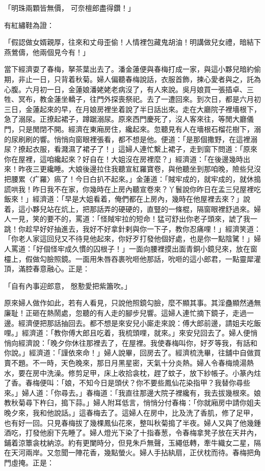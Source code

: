\begin{showcontents}{}
「明珠兩顆皆無價，  可奈檀郎盡得鑽！」

有紅繡鞋為證：

「假認做女婿親厚，往來和丈母歪偷！人情裡包藏鬼胡油！明講做兒女禮，暗結下燕鶯儔，他兩個見今有！」

當下經濟耍了春梅，拏茶葉出去了。潘金蓮便與春梅打成一家，與這小夥兒暗約偷期，非止一日，只背着秋菊。婦人偏聽春梅說話，衣服首飾，揀心愛者與之，託為心腹。六月初一日，金蓮娘潘姥姥老病沒了，有人來說。吳月娘買一張插卓、三牲、冥布，教金蓮坐轎子，往門外探喪祭祀。去了一遭回來。到次日，都是六月初三日，金蓮起來的早，在月娘房裡坐着說了半日話出來。走在大廳院子裡墻根下，急了溺尿。正撩起裙子，蹲踞溺尿。原來西門慶死了，沒人客來往，等閒大廳儀門，只是閒閉不開。經濟在東廂房住，纔起來。忽聽見有人在墻根石榴花樹下，溺的尿刷刷的響。悄悄向窗眼裡張看，都不想是他。便道：「是那個撒野，在這裡溺尿？撩起衣服，看濺濕了裙子了！」這婦人連忙繫上裙子，走到窗下問道：「原來你在屋裡，這咱纔起來？好自在！大姐沒在房裡麼？」經濟道：「在後邊幾時出來！昨夜三更纔睡。大娘後邊拉住我聽宣紅羅寶卷，與他聽坐到那咱晚，險些兒沒把腰累〈疒羅〉瘑了！今日白扒不起來。」金蓮道：「賊牢成的，就牢成的，就休搗謊哄我！昨日我不在家，你幾時在上房內聽宣卷來？丫鬟說你昨日在孟三兒屋裡吃飯來！」經濟道：「早是大姐看着，俺們都在上房內，幾時在他屋裡去來？」說着，這小夥兒站在炕上，把那話弄的硬硬的，直豎的一條棍，隔窗眼裡舒過來。婦人一見，笑的要不的，罵道：「怪賊牢拉的短命！猛可舒出你老子頭來，諕了我一跳！你趁早好好抽進去，我好不好拿針剌與你一下子，教你忍痛哩！」經濟笑道：「你老人家這回兒又不待見他起來，你好歹打發他個好處，也是你一點陰騭！」婦人罵道：「好個怪牢成久慣的囚根子！」一面向腰裡摸出面青銅小鏡兒來，放在窗欞上，假做勾臉照鏡。一面用朱唇吞裹吮咂他那話，吮咂的這小郎君，一點靈犀灌頂，滿腔春意融心。正是：

「自有內事迎郎意，  慇懃愛把紫簫吹。」

原來婦人做作如此，若有人看見，只說他照鏡勾臉，麼不顯其事。其淫蠱顯然通無廉耻！正砸在熱鬧處，忽聽的有人走的腳步兒響。這婦人連忙摘下鏡子，走過一邊。經濟便把那話抽回去。都不想是來安兒小廝走來說：傅大郎前邊，請姐夫吃飯哩。」經濟道：「教你傅大郎且吃着，我梳頭哩，就來。」來安兒回去了。婦人便悄悄向經濟說：「晚夕你休往那裡去了，在屋裡。我使春梅叫你，好歹等我，有話和你說。」經濟道：「謹依來命！」婦人說畢，回房去了。經濟梳洗畢，往舖中自做買賣不題。不一時，天色晚來，那日月黑星密，天氣十分炎熱。婦人令春梅燒湯熱水，要在房中洗澡。修剪足甲，床上收拾衾枕，趕了蚊子，放下紗帳子。小篆內炷了香。春梅便叫：「娘，不知今日是頭伏？你不要些鳳仙花染指甲？我替你尋些來。」婦人道：「你尋去。」春梅道：「我直往那邊大院子裡纔有，我去拔幾根來。娘教秋菊尋下杵臼，搗下蒜。」婦人附耳低言，悄悄分付春梅：「你就廂房中請你姐夫晚夕來，我和他說話。」這春梅去了。這婦人在房中，比及洗了香肌，修了足甲，也有好一回。只見春梅拔了幾棵鳳仙花來，整叫秋菊搗了半夜。婦人又與了他幾鍾酒吃，打發他廚下先睡了。婦人燈光下染了十指春葱，令春梅拿凳子放在天井內，鋪着涼簟衾枕納涼。約有更闌時分，但見朱戶無聲，玉繩低轉，牽牛織女二星，隔在天河兩岸。又忽聞一陣花香，幾點螢火。婦人手拈紈扇，正伏枕而待。春梅把角門虛掩。正是：


\end{showcontents}
